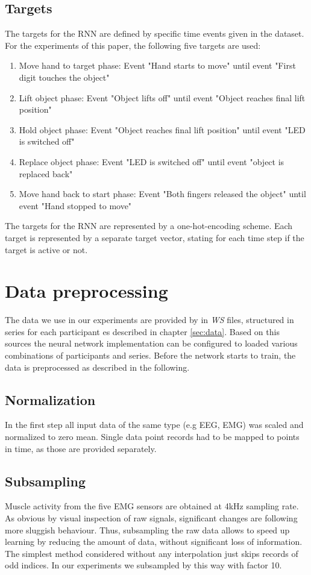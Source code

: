 \documentclass{article} %
\begin{document}
\subsection{Targets}
The targets for the RNN are defined by specific time events given in the dataset. For the experiments of this paper, the following five targets are used:
\begin{enumerate}
	\item Move hand to target phase: Event "Hand starts to move"  until event "First digit touches the object"
	\item Lift object phase: Event "Object lifts off" until event "Object reaches final lift position"
	\item Hold object phase: Event "Object reaches final lift position" until event "LED is switched off"
	\item Replace object phase: Event "LED is switched off" until event "object is replaced back"
	\item Move hand back to start phase: Event "Both fingers released the object" until event "Hand stopped to move"
\end{enumerate}
The targets for the RNN are represented by a one-hot-encoding scheme. Each target is represented by a separate target vector, stating for each time step if the target is active or not.



\section{Data preprocessing}
The data we use in our experiments are provided by \cite{nature} in \textit{WS} files, structured in series for each participant es described in chapter \ref{sec:data}. Based on this sources the neural network implementation can be configured to loaded various combinations of participants and series. Before the network starts to train, the data is preprocessed as described in the following.

\subsection{Normalization}
In the first step all input data of the same type (e.g EEG, EMG) was scaled and normalized to zero mean. Single data point records had to be mapped to points in time, as those are provided separately.

\subsection{Subsampling}
Muscle activity from the five EMG sensors are obtained at 4kHz sampling rate. As obvious by visual inspection of raw signals, significant changes are following more sluggish behaviour. Thus, subsampling the raw data allows to speed up learning by reducing the amount of data, without significant loss of information. The simplest method considered without any interpolation just skips records of odd indices. In our experiments we subsampled by this way with factor 10.
\end{document}
